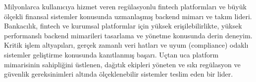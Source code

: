 Milyonlarca kullanıcıya hizmet veren regülasyonlu fintech platformları ve büyük ölçekli finansal sistemler konusunda uzmanlaşmış backend mimarı ve takım lideri. Bankacılık, fintech ve kurumsal platformlar için yüksek erişilebilirlikte, yüksek performanslı backend mimarileri tasarlama ve yönetme konusunda derin deneyim. Kritik işlem altyapıları, gerçek zamanlı veri hatları ve uyum (compliance) odaklı sistemler geliştirme konusunda kanıtlanmış başarı. Uçtan uca platform mimarisinin sahipliğini üstlenen, dağıtık ekipleri yöneten ve sıkı regülasyon ve güvenlik gereksinimleri altında ölçeklenebilir sistemler teslim eden bir lider.

